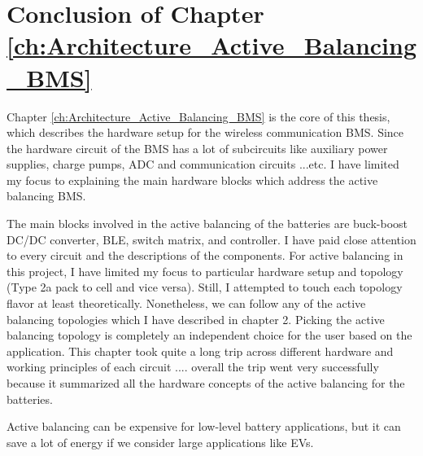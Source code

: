 \section*{Conclusion of Chapter \ref{ch:Architecture_Active_Balancing_BMS}}
Chapter \ref{ch:Architecture_Active_Balancing_BMS} is the core of this thesis, which describes the hardware setup for the wireless communication BMS. Since the hardware circuit of the BMS has a lot of subcircuits like auxiliary power supplies, charge pumps, ADC and communication circuits ...etc. I have limited my focus to explaining the main hardware blocks which address the active balancing BMS.

The main blocks involved in the active balancing of the batteries are buck-boost DC/DC converter, BLE, switch matrix, and controller. I have paid close attention to every circuit and the descriptions of the components. For active balancing in this project, I have limited my focus to particular hardware setup and topology (Type 2a pack to cell and vice versa). Still, I attempted to touch each topology flavor at least theoretically. Nonetheless, we can follow any of the active balancing topologies which I have described in chapter 2. Picking the active balancing topology is completely an independent choice for the user based on the application. This chapter took quite a long trip across different hardware and working principles of each circuit .... overall the trip went very successfully because it summarized all the hardware concepts of the active balancing for the batteries.

Active balancing can be expensive for low-level battery applications, but it can save a  lot of energy if we consider large applications like EVs.